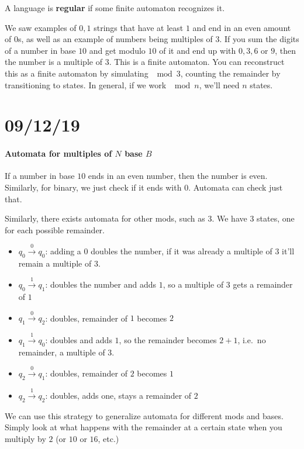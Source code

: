 \documentclass[12 pt]{article}
\begin{document}
A language is \textbf{regular} if some finite automaton recognizes it.

We saw examples of $0,1$ strings that have at least $1$ and end in an
even amount of $0$s, as well as an example of numbers being multiples
of $3$. If you sum the digits of a number in base $10$ and get modulo
$10$ of it and end up with $0,3,6$ or $9$, then the number is a
multiple of $3$. This is a finite automaton. You can reconstruct this
as a finite automaton by simulating $\mod 3$, counting the remainder
by transitioning to states. In general, if we work $\mod n$, we'll
need $n$ states.
\section{09/12/19}
\paragraph{Automata for multiples of $N$ base $B$}
If a number in base $10$ ends in an even number, then the number is
even. Similarly, for binary, we just check if it ends with
$0$. Automata can check just that.

Similarly, there exists automata for other mods, such as $3$. We have $3$ states, one for each possible
remainder.
\begin{itemize}
\item $q_0 \stackrel{0}{\to} q_0$: adding a $0$ doubles the number, if
  it was already a multiple of $3$ it'll remain a multiple of $3$.
\item $q_0 \stackrel{1}{\to} q_1$: doubles the number and adds $1$, so
  a multiple of $3$ gets a remainder of $1$
\item $q_1 \stackrel{0}{\to} q_2$: doubles, remainder of $1$ becomes $2$
\item $q_1 \stackrel{1}{\to} q_0$: doubles and adds $1$, so the
  remainder becomes $2 + 1$, i.e.\ no remainder, a multiple of $3$.
\item $q_2 \stackrel{0}{\to} q_1$: doubles, remainder of $2$ becomes
  $1$
\item $q_2 \stackrel{1}{\to} q_2$: doubles, adds one, stays a
  remainder of $2$
\end{itemize}

We can use this strategy to generalize automata for different mods and
bases. Simply look at what happens with the remainder at a certain
state when you multiply by $2$ (or $10$ or $16$, etc.)
\end{document}
